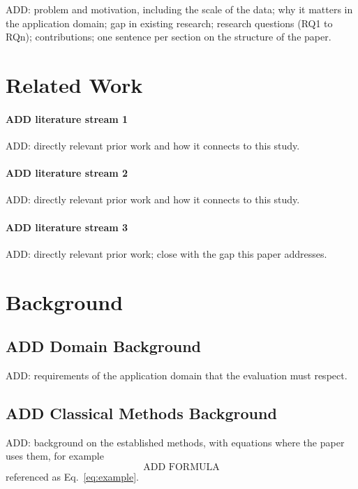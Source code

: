 \documentclass[final,5p,twocolumn]{elsarticle}
\begin{document}
ADD: problem and motivation, including the scale of the data; why it matters in the application domain; gap in existing research; research questions (RQ1 to RQn); contributions; one sentence per section on the structure of the paper.


\section{Related Work}
\label{sec:related_work}

\paragraph{ADD literature stream 1}
ADD: directly relevant prior work and how it connects to this study.

\paragraph{ADD literature stream 2}
ADD: directly relevant prior work and how it connects to this study.

\paragraph{ADD literature stream 3}
ADD: directly relevant prior work; close with the gap this paper addresses.


\section{Background}
\label{sec:background}

\subsection{ADD Domain Background}
\label{subsec:domain_background}
ADD: requirements of the application domain that the evaluation must respect.

\subsection{ADD Classical Methods Background}
\label{subsec:classical_background}
ADD: background on the established methods, with equations where the paper uses them, for example
\begin{equation}
    \text{ADD FORMULA}
    \label{eq:example}
\end{equation}
referenced as Eq.~\eqref{eq:example}.
\end{document}

